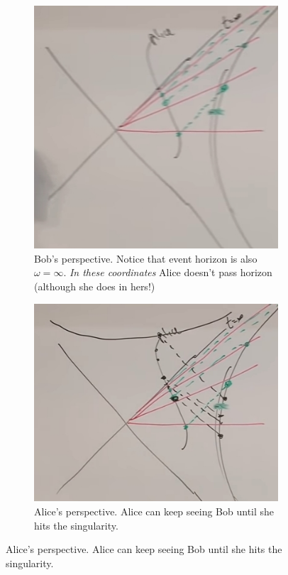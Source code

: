 \documentclass[]{article}
\begin{document}
{ \begin{figure}[H]
 	\caption{Alice falls in}
 	\begin{subfigure}{0.3\textwidth}
 		\caption{Bob's perspective. Notice that event horizon is also $\omega=\infty$. \emph{In these coordinates} Alice doesn't pass horizon (although she does in hers!)}\label{fig:gr-7-alice-falls-in}
 		\includegraphics[width=\textwidth]{gr-7-alice-falls-in}
 	\end{subfigure}
  	\begin{subfigure}{0.3\textwidth}
	 	\caption{Alice's perspective. Alice can keep seeing Bob until she hits the singularity.}\label{fig:gr-7-alice-falls-in-alice-POV}
	 	\includegraphics[width=\textwidth]{gr-7-alice-falls-in-alice-POV}

\end{subfigure}
\end{figure}}
\end{document}
